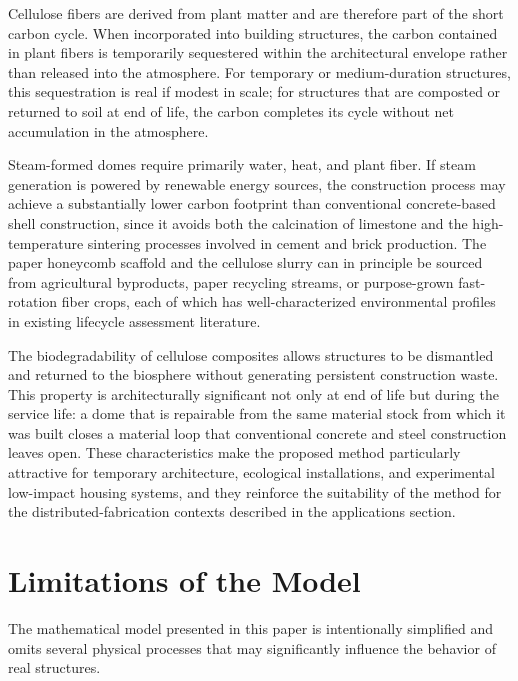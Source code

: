 \documentclass[12pt,a4paper]{article}
\begin{document}
Cellulose fibers are derived from plant matter and are therefore part
of the short carbon cycle. When incorporated into building structures,
the carbon contained in plant fibers is temporarily sequestered within
the architectural envelope rather than released into the atmosphere.
For temporary or medium-duration structures, this sequestration is
real if modest in scale; for structures that are composted or returned
to soil at end of life, the carbon completes its cycle without net
accumulation in the atmosphere.

Steam-formed domes require primarily water, heat, and plant fiber.
If steam generation is powered by renewable energy sources, the
construction process may achieve a substantially lower carbon footprint
than conventional concrete-based shell construction, since it avoids
both the calcination of limestone and the high-temperature sintering
processes involved in cement and brick production. The paper honeycomb
scaffold and the cellulose slurry can in principle be sourced from
agricultural byproducts, paper recycling streams, or purpose-grown
fast-rotation fiber crops, each of which has well-characterized
environmental profiles in existing lifecycle assessment literature.

The biodegradability of cellulose composites allows structures to be
dismantled and returned to the biosphere without generating persistent
construction waste. This property is architecturally significant not
only at end of life but during the service life: a dome that is
repairable from the same material stock from which it was built closes
a material loop that conventional concrete and steel construction
leaves open. These characteristics make the proposed method
particularly attractive for temporary architecture, ecological
installations, and experimental low-impact housing systems, and they
reinforce the suitability of the method for the distributed-fabrication
contexts described in the applications section.

\section{Limitations of the Model}

The mathematical model presented in this paper is intentionally
simplified and omits several physical processes that may significantly
influence the behavior of real structures.
\end{document}
